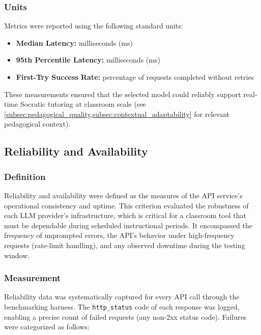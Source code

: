 \subsubsection{Units}
\label{subsubsec:latency_units}
Metrics were reported using the following standard units:

\begin{itemize}
    \item \textbf{Median Latency:} milliseconds (ms)
    \item \textbf{95th Percentile Latency:} milliseconds (ms)
    \item \textbf{First-Try Success Rate:} percentage of requests completed without retries
\end{itemize}

These measurements ensured that the selected model could reliably support real-time Socratic tutoring at classroom scale (see \cref{subsec:pedagogical_quality,subsec:contextual_adaptability} for relevant pedagogical context).

\subsection{Reliability and Availability}
\label{subsec:reliability_availability}

\subsubsection{Definition}
\label{subsubsec:reliability_definition}
Reliability and availability were defined as the measures of the API service's operational consistency and uptime. This criterion evaluated the robustness of each LLM provider's infrastructure, which is critical for a classroom tool that must be dependable during scheduled instructional periods. It encompassed the frequency of unprompted errors, the API's behavior under high-frequency requests (rate-limit handling), and any observed downtime during the testing window.

\subsubsection{Measurement}
\label{subsubsec:reliability_measurement}
Reliability data was systematically captured for every API call through the benchmarking harness. The \verb|http_status| code of each response was logged, enabling a precise count of failed requests (any non-2xx status code). Failures were categorized as follows:

